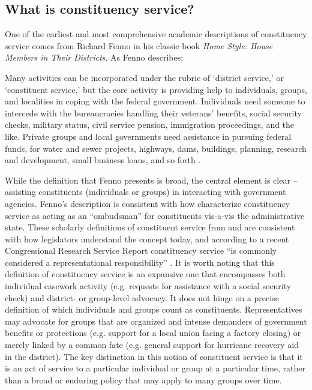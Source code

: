 \documentclass{article}
\begin{document}
\subsection{What is constituency service?}

One of the earliest and most comprehensive academic descriptions of constituency service comes from Richard Fenno in his classic book \emph{Home Style: House Members in Their Districts}. As Fenno describes:

\begin{displayquote}
Many activities can be incorporated under the rubric of `district service,' or `constituent service,' but the core activity is providing help to individuals, groups, and localities in coping with the federal government.  Individuals need someone to intercede with the bureaucracies handling their veterans' benefits, social security checks, military status, civil service pension, immigration proceedings, and the like.  Private groups and local governments need assistance in pursuing federal funds, for water and sewer projects, highways, dams, buildings, planning, research and development, small business loans, and so forth \citep[pg. 101]{Fenno1978}.
\end{displayquote}

While the definition that Fenno presents is broad, the central element is clear -- assisting constituents (individuals or groups) in interacting with government agencies.  Fenno's description is consistent with how \citet[pg. 2]{CainFerejohnFiorina1987} characterize constituency service as acting as an ``ombudsman'' for constituents vis-a-vis the administrative state.  These scholarly definitions of constituent service from \citep{Fenno1978} and \citet{CainFerejohnFiorina1987} are consistent with how legislators understand the concept today, and according to a recent Congressional Research Service Report constituency service ``is commonly considered a representational responsibility'' \citep{Eckman2017}.  It is worth noting that this definition of constituency service is an expansive one that encompasses both individual casework activity (e.g. requests for assistance with a social security check) and district- or group-level advocacy. It does not hinge on a precise definition of which individuals and groups count as constituents. Representatives may advocate for groups that are organized and intense demanders of government benefits or protections (e.g. support for a local union facing a factory closing) or merely linked by a common fate (e.g. general support for hurricane recovery aid in the district). The key distinction in this notion of constituent service is that it is an act of service to a particular individual or group at a particular time, rather than a broad or enduring policy that may apply to many groups over time. 
\end{document}
